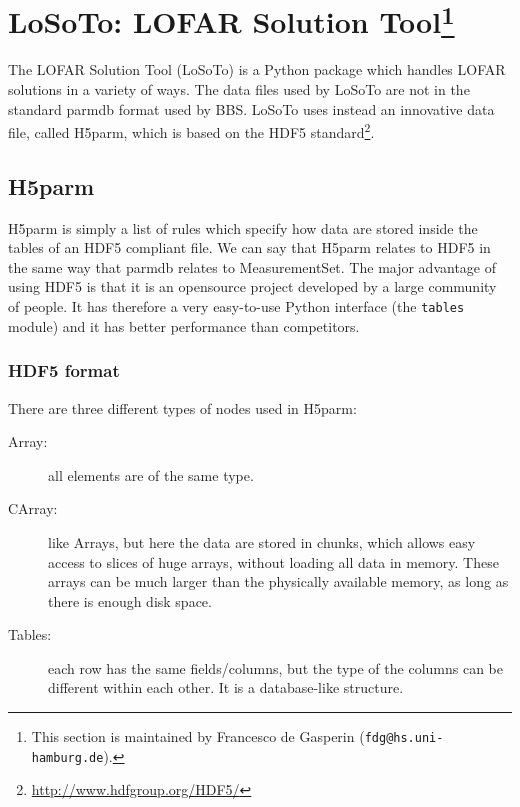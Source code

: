 \documentclass[structabstract]{article}
\begin{document}

\def \losoto {LoSoTo}

\section[LoSoTo: LOFAR Solution Tool]{\losoto: LOFAR Solution Tool\footnote{This section is maintained by Francesco de Gasperin ({\tt fdg@hs.uni-hamburg.de}).}}
\label{BBS}

The LOFAR Solution Tool (\losoto{}) is a Python package which handles LOFAR solutions in a variety of ways. The data files used by \losoto{} are not in the standard parmdb format used by BBS. \losoto{} uses instead an innovative data file, called H5parm, which is based on the HDF5 standard\footnote{\url{http://www.hdfgroup.org/HDF5/}}.

\subsection{H5parm}
\label{losoto:h5parm}

H5parm is simply a list of rules which specify how data are stored inside the tables of an HDF5 compliant file. We can say that H5parm relates to HDF5 in the same way that parmdb relates to MeasurementSet. The major advantage of using HDF5 is that it is an opensource project developed by a large community of people. It has therefore a very easy-to-use Python interface (the \texttt{tables} module) and it has better performance than competitors.

\subsubsection{HDF5 format}
\label{losoto:HDF5}

There are three different types of nodes used in H5parm:
\begin{description}
 \item[Array:] all elements are of the same type.
 \item[CArray:] like Arrays, but here the data are stored in chunks, which allows easy access to
slices of huge arrays, without loading all data in memory. These arrays can be much
larger than the physically available memory, as long as there is enough disk space.
 \item[Tables:] each row has the same fields/columns, but the type of the columns can be different within each other. It is a database-like structure.
\end{description}
\end{document}
